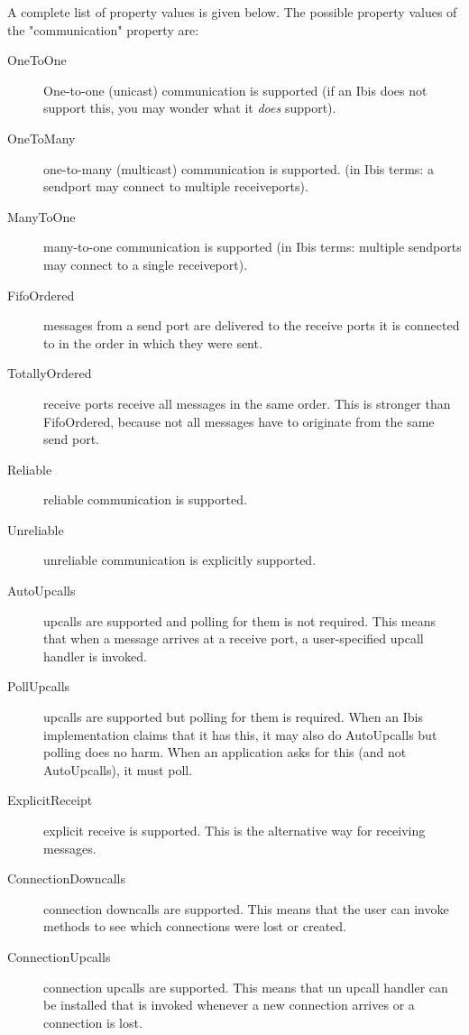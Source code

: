 \documentclass[10pt]{article}
\begin{document}
A complete list of property values is given below.
The possible property values of the "communication" property are:
\begin{description}
\item[OneToOne]
One-to-one (unicast) communication is supported (if an Ibis does not support
this, you may wonder what it \emph{does} support).
\item[OneToMany]
one-to-many (multicast) communication is supported.
(in Ibis terms: a sendport
may connect to multiple receiveports).
\item[ManyToOne]
many-to-one communication is supported (in Ibis terms: multiple
sendports may connect to a single receiveport).
\item[FifoOrdered]
messages from a send port are delivered to the receive ports it is
connected to in the order in which they were sent.
\item[TotallyOrdered]
receive ports receive all messages in the same order.
This is stronger than FifoOrdered, because not all messages have
to originate from the same send port.
\item[Reliable]
reliable communication is supported.
\item[Unreliable]
unreliable communication is explicitly supported.
\item[AutoUpcalls]
upcalls are supported and polling for them is not required.
This means that when a message arrives at a receive port, 
a user-specified upcall handler is invoked.
\item[PollUpcalls]
upcalls are supported but polling for them is required. When an
Ibis implementation claims that it has this, it may also do
AutoUpcalls but polling does no harm. When an application asks for
this (and not AutoUpcalls), it must poll.
\item[ExplicitReceipt]
explicit receive is supported.
This is the alternative way for receiving messages.
\item[ConnectionDowncalls]
connection downcalls are supported. This means that the user can
invoke methods to see which connections were lost or created.
\item[ConnectionUpcalls]
connection upcalls are supported. This means that un upcall
handler can be installed that is invoked whenever a new connection arrives
or a connection is lost.
\end{description}
\end{document}
